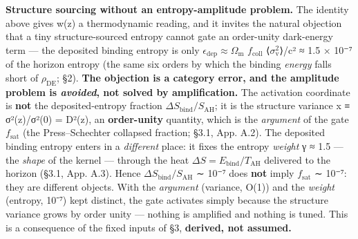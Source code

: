 \documentclass[
  10pt,
]{article}
\begin{document}
\textbf{Structure sourcing without an entropy-amplitude problem.} The
identity above gives w(z) a thermodynamic reading, and it invites the
natural objection that a tiny structure-sourced entropy cannot gate an
order-unity dark-energy term --- the deposited binding entropy is only
\(\epsilon _{\mathrm{dep}} \approx  \Omega _{\mathrm{m}}\)
\(f_{\mathrm{coll}}\) ⟨\(\sigma _{\mathrm{v}}^{2}\)⟩/c² ≈ 1.5 × 10⁻⁷ of
the horizon entropy (the same six orders by which the binding
\emph{energy} falls short of \(\rho _{\mathrm{DE}}\); §2). \textbf{The
objection is a category error, and the amplitude problem is
\emph{avoided}, not solved by amplification.} The activation coordinate
is \textbf{not} the deposited-entropy fraction
\(\Delta S_{\mathrm{bind}}/S_{\mathrm{AH}}\); it is the structure
variance x ≡ σ²(z)/σ²(0) = D²(z), an \textbf{order-unity} quantity,
which is the \emph{argument} of the gate \(f_{\mathrm{sat}}\) (the
Press--Schechter collapsed fraction; §3.1, App. A.2). The deposited
binding entropy enters in a \emph{different} place: it fixes the entropy
\emph{weight} γ ≈ 1.5 --- the \emph{shape} of the kernel --- through the
heat \(\Delta S = E_{\mathrm{bind}}/T_{\mathrm{AH}}\) delivered to the
horizon (§3.1, App. A.3). Hence
\(\Delta S_{\mathrm{bind}}/S_{\mathrm{AH}}\) ∼ 10⁻⁷ does \textbf{not}
imply \(f_{\mathrm{sat}}\) ∼ 10⁻⁷: they are different objects. With the
\emph{argument} (variance, O(1)) and the \emph{weight} (entropy, 10⁻⁷)
kept distinct, the gate activates simply because the structure variance
grows by order unity --- nothing is amplified and nothing is tuned. This
is a consequence of the fixed inputs of §3, \textbf{derived, not
assumed.}
\end{document}
